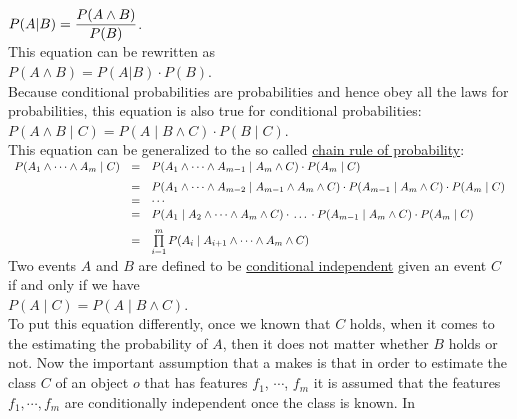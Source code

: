 $\displaystyle P(A|B) = \frac{P(A \wedge B)}{P(B)}$.
\\[0.2cm]
This equation can be rewritten as
\\[0.2cm]
\hspace*{1.3cm}
$P(A \wedge B) = P(A|B) \cdot P(B)$.
\\[0.2cm]
Because conditional probabilities are probabilities and hence obey all the laws for probabilities, this
equation is also true for conditional probabilities: 
\\[0.2cm]
\hspace*{1.3cm}
$P(A \wedge B\;|\;C) = P(A\;|\;B \wedge C) \cdot P(B\;|\;C)$.
\\[0.2cm]
This equation can be generalized to the so called \href{https://en.wikipedia.org/wiki/Chain_rule_(probability)}{chain rule of probability}:
\\[0.2cm]
\hspace*{1.2cm}
$
\begin{array}[t]{lcl}
       P(A_1 \wedge \cdots \wedge A_m \;|\;C) 
 & = & P(A_1 \wedge  \cdots \wedge A_{m-1}\;|\;A_{m} \wedge C) \cdot P(A_{m}\;|\;C) \\[0.2cm]
 & = & P(A_1 \wedge  \cdots \wedge A_{m-2}\;|\;A_{m-1} \wedge A_{m} \wedge C) \cdot P(A_{m-1} \;|\;A_m \wedge C)\cdot P(A_{m}\;|\;C) \\
 & = & \cdots \\
 & = &  P(A_1 \;|\; A_2 \wedge  \cdots \wedge A_{m} \wedge C) \cdot \,\dots\, \cdot P(A_{m-1} \;|\;A_m \wedge C)\cdot P(A_{m}\;|\;C) \\[0.2cm]
 & = & \prod\limits_{i=1}^m P(A_i \;|\; A_{i+1} \wedge  \cdots \wedge A_{m} \wedge C) 
\end{array}
$
\\[0.2cm]
Two events $A$ and $B$ are defined to be \href{https://en.wikipedia.org/wiki/Conditional_independence}{conditional independent}
given an event $C$ if and only if we have
\\[0.2cm]
\hspace*{1.3cm}
$P(A \;|\; C) = P(A \;|\; B \wedge C)$.
\\[0.2cm]
To put this equation differently, once we known that $C$ holds, when it comes to the estimating the probability of $A$,
then it does not matter whether $B$ holds or not.  Now the important assumption that a  
makes is that in order to estimate the class $C$ of an object $o$ that has features $f_1$, $\cdots$, $f_m$ it
is assumed that the features $f_1, \cdots, f_m$ are conditionally independent once the class is known.  In
